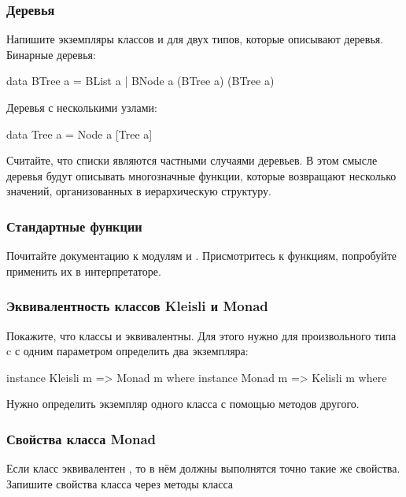 \subsubsection{Деревья}

Напишите экземпляры классов  и 
для двух типов, которые описывают деревья. Бинарные деревья:

\begin{code}
data BTree a = BList a | BNode a (BTree a) (BTree a)
\end{code}

Деревья с несколькими узлами:

\begin{code}
data Tree a = Node a [Tree a]
\end{code}

Считайте, что списки являются частными случаями деревьев.
В этом смысле деревья будут описывать многозначные функции,
которые возвращают несколько значений, организованных 
в иерархическую структуру. 

\subsubsection{Стандартные функции}

Почитайте документацию к модулям 
и . Присмотритесь к функциям, 
попробуйте применить их в интерпретаторе. 

\subsubsection{Эквивалентность классов Kleisli и Monad}

Покажите, что классы  и 
эквивалентны. Для этого нужно для произвольного
типа c с одним параметром  определить два экземпляра: 

\begin{code}
instance Kleisli m => Monad   m where
instance Monad   m => Kelisli m where
\end{code}

Нужно определить экземпляр одного класса с помощью методов другого.

\subsubsection{Свойства класса Monad}

Если класс  эквивалентен ,
то в нём должны выполнятся точно такие же свойства.
Запишите свойства класса  через методы
класса  
